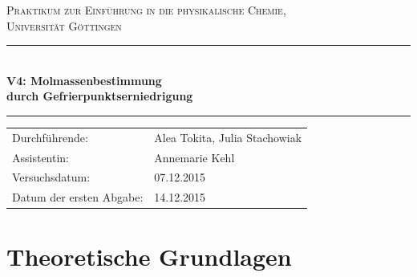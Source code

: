 \documentclass[12pt,a4paper,titlepage,headinclude,bibtotoc]{scrartcl}
\begin{document}
\begin{titlepage}
\centering
\textsc{\Large Praktikum zur Einführung in die physikalische Chemie,\\[1.5ex] Universität Göttingen}

\vspace*{2cm}

\rule{\textwidth}{1pt}\\[0.5cm]
{\huge \bfseries
  V4: Molmassenbestimmung\\[1.5ex]
  durch Gefrierpunktserniedrigung}\\[0.5cm]
\rule{\textwidth}{1pt}

\vspace*{1cm}


\begin{Large}
\begin{tabular}{ll}
Durchführende: &  Alea Tokita, Julia Stachowiak\\
Assistentin: & Annemarie Kehl\\
 Versuchsdatum: & 07.12.2015\\
 Datum der ersten Abgabe: & 14.12.2015
\end{tabular}
\end{Large}

\vspace*{2cm}

\begin{Large}
\end{Large}

\end{titlepage}

\tableofcontents

\newpage

\section{Theoretische Grundlagen}
\end{document}
